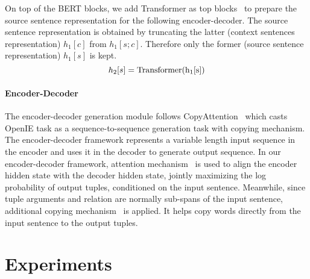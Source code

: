\documentclass[11pt,a4paper]{article}
\begin{document}
On top of the BERT blocks, we add Transformer as top blocks~\cite{vaswani2017attention} to prepare the source sentence representation for the following encoder-decoder.
The source sentence representation is obtained by truncating the latter (context sentences representation) $h_1[c]$ from $h_1[s;c]$. Therefore only the former (source sentence representation) $h_1[s]$ is kept.
\begin{equation}
    h_2[s] = \rm{Transformer}(h_1[s])
\end{equation}

\paragraph{Encoder-Decoder}
The encoder-decoder generation module follows CopyAttention~\cite{cui2018neural} which casts OpenIE task as a sequence-to-sequence generation task with copying mechanism. The encoder-decoder framework represents a variable length input sequence in the encoder and uses it in the decoder to generate output sequence. In our encoder-decoder framework, attention mechanism~\cite{bahdanau2014neural} is used to align the encoder hidden state with the decoder hidden state, jointly maximizing the log probability of output tuples, conditioned on the input sentence. Meanwhile, since tuple arguments and relation are normally sub-spans of the input sentence, additional copying mechanism~\cite{gu2016incorporating} is applied. It helps copy words directly from the input sentence to the output tuples.

\section{Experiments}
\label{sec:exp}
\end{document}

